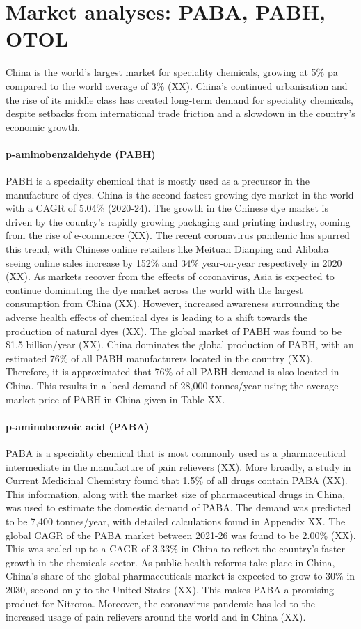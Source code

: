 \section{Market analyses: PABA, PABH, OTOL}
\label{sec:market-analysis}
China is the world’s largest market for speciality chemicals, growing at 5\% pa compared to the world average of 3\% (XX). China’s continued urbanisation and the rise of its middle class has created long-term demand for speciality chemicals, despite setbacks from international trade friction and a slowdown in the country’s economic growth.

\paragraph{p-aminobenzaldehyde (PABH)}
PABH is a speciality chemical that is mostly used as a precursor in the manufacture of dyes. China is the second fastest-growing dye market in the world with a CAGR of 5.04\% (2020-24). The growth in the Chinese dye market is driven by the country’s rapidly growing packaging and printing industry, coming from the rise of e-commerce (XX). The recent coronavirus pandemic has spurred this trend, with Chinese online retailers like Meituan Dianping and Alibaba seeing online sales increase by 152\% and 34\% year-on-year respectively in 2020 (XX). As markets recover from the effects of coronavirus, Asia is expected to continue dominating the dye market across the world with the largest consumption from China (XX). However, increased awareness surrounding the adverse health effects of chemical dyes is leading to a shift towards the production of natural dyes (XX). The global market of PABH was found to be \$1.5 billion/year (XX). China dominates the global production of PABH, with an estimated 76\% of all PABH manufacturers located in the country (XX). Therefore, it is approximated that 76\% of all PABH demand is also located in China. This results in a local demand of 28,000 tonnes/year using the average market price of PABH in China given in Table XX.

\paragraph{p-aminobenzoic acid (PABA)}
PABA is a speciality chemical that is most commonly used as a pharmaceutical intermediate in the manufacture of pain relievers (XX). More broadly, a study in Current Medicinal Chemistry found that 1.5\% of all drugs contain PABA (XX). This information, along with the market size of pharmaceutical drugs in China, was used to estimate the domestic demand of PABA. The demand was predicted to be 7,400 tonnes/year, with detailed calculations found in Appendix XX. The global CAGR of the PABA market between 2021-26 was found to be 2.00\% (XX). This was scaled up to a CAGR of 3.33\% in China to reflect the country’s faster growth in the chemicals sector. As public health reforms take place in China, China’s share of the global pharmaceuticals market is expected to grow to 30\% in 2030, second only to the United States (XX). This makes PABA a promising product for Nitroma. Moreover, the coronavirus pandemic has led to the increased usage of pain relievers around the world and in China (XX).

